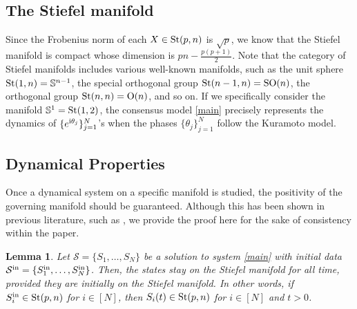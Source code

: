 \documentclass[11pt,reqno]{amsart}
\numberwithin{figure}{section}
\newcommand{\St}{  {\textup{St}}(p,n) }
\newcommand{\init}{  {\textup{in}} }
\newtheorem{lemma}{Lemma}[section]
\begin{document}
\subsection{The Stiefel manifold}
Since the Frobenius norm of each $X \in \St$ is $\sqrt p$, we know that the Stiefel manifold is compact whose dimension is $pn - \frac{p(p+1)}{2}$. Note that the category of Stiefel manifolds includes various well-known manifolds, such as the unit sphere $\textup{St}(1,n) = \mathbb{S}^{n-1}$, the special orthogonal group $\textup{St}(n-1,n) = \textup{SO}(n)$, the orthogonal group $\textup{St}(n,n) = \textup{O}(n)$, and so on.  If we specifically consider the manifold $\mathbb{S}^1=\textup{St}(1,2)$, the consensus model \eqref{main} precisely represents the dynamics of $\{e^{{\rm i}\theta_j} \}_{j=1}^N$'s when the phases $\{\theta_j\}_{j=1}^N$ follow the Kuramoto model.





\subsection{Dynamical Properties}
Once a dynamical system on a specific manifold is studied, the positivity of the governing manifold should be guaranteed. Although this has been shown in previous literature, such as \cite{HKK22}, we provide the proof here for the sake of consistency within the paper. 


\begin{lemma} \label{L2.1}
Let $\mathcal S = \{S_1,\ldots,S_N\}$ be a solution to system \eqref{main} with initial data $\mathcal S^\init =\{S_1^\init, \ldots, S_N^\init\}$. Then, the states stay on the Stiefel manifold for all time, provided they are initially on the Stiefel manifold. In other words, if $S_i^\init \in \St$ for $i\in [N]$, then $S_i(t) \in \St$ for $i\in [N]$ and $t>0$.
\end{lemma}
\end{document}
